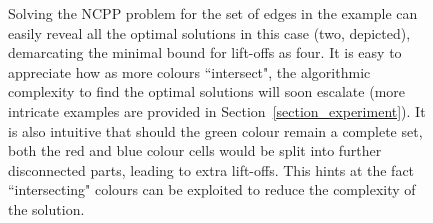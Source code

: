 \documentclass[journal]{IEEEtran}
\begin{document}
\begin{figure}[t]
{}
\caption{Solving the NCPP problem for the set of edges in the example can easily reveal all the optimal solutions in this case (two, depicted), demarcating the minimal bound for lift-offs as four. 
It is easy to appreciate how as more colours ``intersect", the algorithmic complexity to find the optimal solutions will soon escalate (more intricate examples are provided in Section~\ref{section_experiment}). 
It is also intuitive that should the green colour remain a complete set, both the red and blue colour cells would be split into further disconnected parts, leading to extra lift-offs. 
This hints at the fact ``intersecting" colours can be exploited to reduce the complexity of the solution.
}
\label{fig:mapping}
\end{figure}

\end{document}
